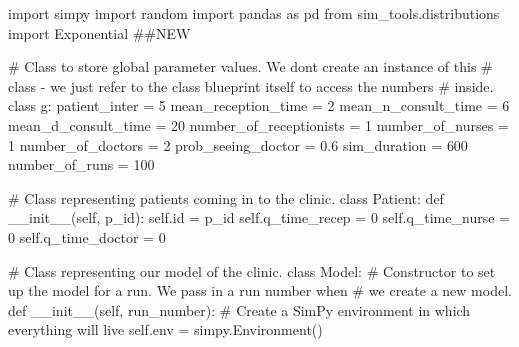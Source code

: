 \documentclass[
  letterpaper,
  DIV=11,
  numbers=noendperiod]{scrreprt}
\newenvironment{Shaded}{\begin{snugshade}}{\end{snugshade}}
\newcommand{\BuiltInTok}[1]{\textcolor[rgb]{0.00,0.23,0.31}{#1}}
\newcommand{\CommentTok}[1]{\textcolor[rgb]{0.37,0.37,0.37}{#1}}
\newcommand{\DecValTok}[1]{\textcolor[rgb]{0.68,0.00,0.00}{#1}}
\newcommand{\FloatTok}[1]{\textcolor[rgb]{0.68,0.00,0.00}{#1}}
\newcommand{\FunctionTok}[1]{\textcolor[rgb]{0.28,0.35,0.67}{#1}}
\newcommand{\ImportTok}[1]{\textcolor[rgb]{0.00,0.46,0.62}{#1}}
\newcommand{\KeywordTok}[1]{\textcolor[rgb]{0.00,0.23,0.31}{#1}}
\newcommand{\NormalTok}[1]{\textcolor[rgb]{0.00,0.23,0.31}{#1}}
\newcommand{\OperatorTok}[1]{\textcolor[rgb]{0.37,0.37,0.37}{#1}}
\newcommand{\VariableTok}[1]{\textcolor[rgb]{0.07,0.07,0.07}{#1}}
\begin{document}
\begin{tcolorbox}[enhanced jigsaw, rightrule=.15mm, colback=white, colframe=quarto-callout-note-color-frame, colbacktitle=quarto-callout-note-color!10!white, toprule=.15mm, coltitle=black, opacityback=0, titlerule=0mm, bottomtitle=1mm, breakable, title=\textcolor{quarto-callout-note-color}{\faInfo}\hspace{0.5em}{Note}, opacitybacktitle=0.6, toptitle=1mm, arc=.35mm, bottomrule=.15mm, leftrule=.75mm, left=2mm]

\begin{Shaded}
\begin{Highlighting}[]
\ImportTok{import}\NormalTok{ simpy}
\ImportTok{import}\NormalTok{ random}
\ImportTok{import}\NormalTok{ pandas }\ImportTok{as}\NormalTok{ pd}
\ImportTok{from}\NormalTok{ sim\_tools.distributions }\ImportTok{import}\NormalTok{ Exponential }\CommentTok{\#\#NEW}

\CommentTok{\# Class to store global parameter values.  We don\textquotesingle{}t create an instance of this}
\CommentTok{\# class {-} we just refer to the class blueprint itself to access the numbers}
\CommentTok{\# inside.}
\KeywordTok{class}\NormalTok{ g:}
\NormalTok{    patient\_inter }\OperatorTok{=} \DecValTok{5}
\NormalTok{    mean\_reception\_time }\OperatorTok{=} \DecValTok{2}
\NormalTok{    mean\_n\_consult\_time }\OperatorTok{=} \DecValTok{6}
\NormalTok{    mean\_d\_consult\_time }\OperatorTok{=} \DecValTok{20}
\NormalTok{    number\_of\_receptionists }\OperatorTok{=} \DecValTok{1}
\NormalTok{    number\_of\_nurses }\OperatorTok{=} \DecValTok{1}
\NormalTok{    number\_of\_doctors }\OperatorTok{=} \DecValTok{2}
\NormalTok{    prob\_seeing\_doctor }\OperatorTok{=} \FloatTok{0.6}
\NormalTok{    sim\_duration }\OperatorTok{=} \DecValTok{600}
\NormalTok{    number\_of\_runs }\OperatorTok{=} \DecValTok{100}

\CommentTok{\# Class representing patients coming in to the clinic.}
\KeywordTok{class}\NormalTok{ Patient:}
    \KeywordTok{def} \FunctionTok{\_\_init\_\_}\NormalTok{(}\VariableTok{self}\NormalTok{, p\_id):}
        \VariableTok{self}\NormalTok{.}\BuiltInTok{id} \OperatorTok{=}\NormalTok{ p\_id}
        \VariableTok{self}\NormalTok{.q\_time\_recep }\OperatorTok{=} \DecValTok{0}
        \VariableTok{self}\NormalTok{.q\_time\_nurse }\OperatorTok{=} \DecValTok{0}
        \VariableTok{self}\NormalTok{.q\_time\_doctor }\OperatorTok{=} \DecValTok{0}

\CommentTok{\# Class representing our model of the clinic.}
\KeywordTok{class}\NormalTok{ Model:}
    \CommentTok{\# Constructor to set up the model for a run.  We pass in a run number when}
    \CommentTok{\# we create a new model.}
    \KeywordTok{def} \FunctionTok{\_\_init\_\_}\NormalTok{(}\VariableTok{self}\NormalTok{, run\_number):}
        \CommentTok{\# Create a SimPy environment in which everything will live}
        \VariableTok{self}\NormalTok{.env }\OperatorTok{=}\NormalTok{ simpy.Environment()}


\end{Highlighting}
\end{Shaded}
\end{tcolorbox}
\end{document}
